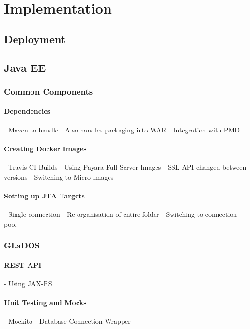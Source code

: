 \chapter{Implementation}

\section{Deployment}

\section{Java EE}
    \subsection{Common Components}
        \subsubsection{Dependencies}
        - Maven to handle
        - Also handles packaging into WAR
        - Integration with PMD

        \subsubsection{Creating Docker Images}
        - Travis CI Builds
        - Using Payara Full Server Images
        - SSL API changed between versions
        - Switching to Micro Images

        \subsubsection{Setting up JTA Targets}
        - Single connection
        - Re-organisation of entire folder
        - Switching to connection pool
        

    \subsection{GLaDOS}
        \subsubsection{REST API}
        - Using JAX-RS

        \subsubsection{Unit Testing and Mocks}
        - Mockito
        - Database Connection Wrapper

